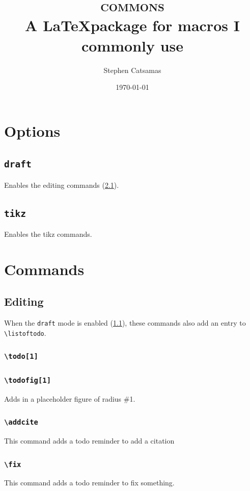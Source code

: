 \documentclass{article}
\title{\Huge\textsc{commons} \\\vspace*{1 em}
    \large A \LaTeX package for macros I commonly use}
\author{Stephen Catsamas}
\date{\today}
\begin{document}
\maketitle
\tableofcontents


\section{Options}
\subsection{\texttt{draft}}\label{sec:opt:draft}
    Enables the editing commands (\cref{sec:com:edit}).

\subsection{\texttt{tikz}}\label{sec:opt:tikz}
    Enables the tikz commands.

\section{Commands}
\subsection{Editing}\label{sec:com:edit}
When the \texttt{draft} mode is enabled (\cref{sec:opt:draft}), these commands also add an entry to  \texttt{\textbackslash listoftodo}.
\subsubsection{\texttt{\textbackslash todo[1]}}

\subsubsection{\texttt{\textbackslash todofig[1]}}
    Adds in a placeholder figure of radius \#1.

\subsubsection{\texttt{\textbackslash addcite}}
    This command adds a todo reminder to add a citation \addcite

\subsubsection{\texttt{\textbackslash fix}}
    This command adds a todo reminder to fix something. \fix
\end{document}
